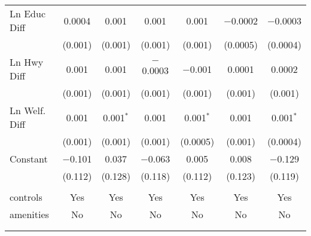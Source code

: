 \begin{table}[!htbp]
\begin{tabular}{@{\extracolsep{5pt}}lcccccc}
  Ln Educ Diff & 0.0004 & 0.001 & 0.001 & 0.001 & $-$0.0002 & $-$0.0003 \\ 
  & (0.001) & (0.001) & (0.001) & (0.001) & (0.0005) & (0.0004) \\ 
  Ln Hwy Diff & 0.001 & 0.001 & $-$0.0003 & $-$0.001 & 0.0001 & 0.0002 \\ 
  & (0.001) & (0.001) & (0.001) & (0.001) & (0.001) & (0.001) \\ 
  Ln Welf. Diff & 0.001 & 0.001$^{*}$ & 0.001 & 0.001$^{*}$ & 0.001 & 0.001$^{*}$ \\ 
  & (0.001) & (0.001) & (0.001) & (0.0005) & (0.001) & (0.0004) \\ 
  Constant & $-$0.101 & 0.037 & $-$0.063 & 0.005 & 0.008 & $-$0.129 \\ 
  & (0.112) & (0.128) & (0.118) & (0.112) & (0.123) & (0.119) \\ 
 \hline \\[-1.8ex] 
controls & Yes & Yes & Yes & Yes & Yes & Yes \\ 
amenities & No & No & No & No & No & No \\ 
\hline \\[-1.8ex] 
\hline 
\hline \\[-1.8ex] 
\end{tabular} 
\end{table} 
